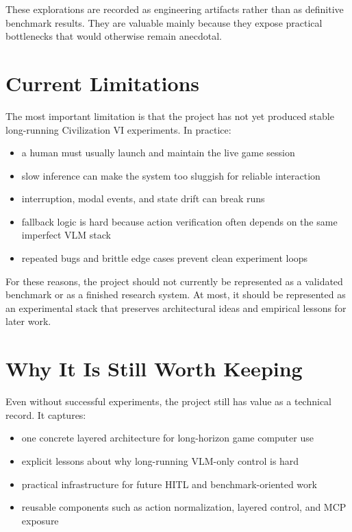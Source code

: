 \documentclass[11pt]{article}
\begin{document}
These explorations are recorded as engineering artifacts rather than as definitive benchmark results. They are valuable mainly because they expose practical bottlenecks that would otherwise remain anecdotal.

\section{Current Limitations}

The most important limitation is that the project has not yet produced stable long-running Civilization VI experiments. In practice:
\begin{itemize}[leftmargin=*]
    \item a human must usually launch and maintain the live game session
    \item slow inference can make the system too sluggish for reliable interaction
    \item interruption, modal events, and state drift can break runs
    \item fallback logic is hard because action verification often depends on the same imperfect VLM stack
    \item repeated bugs and brittle edge cases prevent clean experiment loops
\end{itemize}

For these reasons, the project should not currently be represented as a validated benchmark or as a finished research system. At most, it should be represented as an experimental stack that preserves architectural ideas and empirical lessons for later work.

\section{Why It Is Still Worth Keeping}

Even without successful experiments, the project still has value as a technical record. It captures:
\begin{itemize}[leftmargin=*]
    \item one concrete layered architecture for long-horizon game computer use
    \item explicit lessons about why long-running VLM-only control is hard
    \item practical infrastructure for future HITL and benchmark-oriented work
    \item reusable components such as action normalization, layered control, and MCP exposure
\end{itemize}
\end{document}
